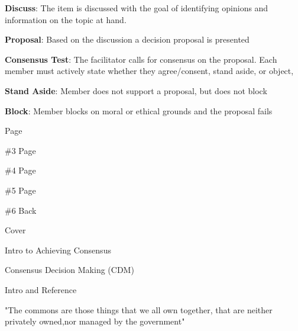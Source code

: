 \documentclass{article}
\begin{document}
	\begin{center}
	\end{center}
	 \newpage%
	
	\textbf{Discuss}: The item is discussed with the goal of identifying opinions and information on the topic at hand.
	
	\textbf{Proposal}: Based on the discussion a decision proposal is presented
	
	\textbf{Consensus Test}: The facilitator calls for consensus on the proposal. Each member must actively state whether they agree/consent, stand aside, or object,
	
	\textbf{Stand Aside}: Member does not support a proposal, but does not block
	
	\textbf{Block}: Member blocks on moral or ethical grounds and the proposal fails
	
	\newpage
	Page\par \#3\newpage
	Page\par \#4\newpage
	Page\par \#5\newpage
	Page\par \#6\newpage
	Back\par Cover \thispagestyle{empty} \newpage
	
	Intro to Achieving       Consensus
	
	Consensus Decision Making (CDM) 
	
	Intro and Reference
	
	"The commons are those things     that we all own together, that are neither privately owned,nor managed by the government"
	
	 \thispagestyle{empty} \newpage
\end{document}
